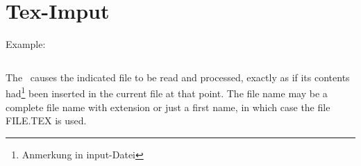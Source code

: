 \section {Tex-Imput}

Example:

\begin{verbatim}

\end{verbatim} 

The \ causes the indicated file to be read and processed,
exactly as if its contents had\footnote{Anmerkung in input-Datei} been 
inserted in the current file at that
point. The file name may be a complete file name with extension or just a
first name, in which case the file FILE.TEX is used.